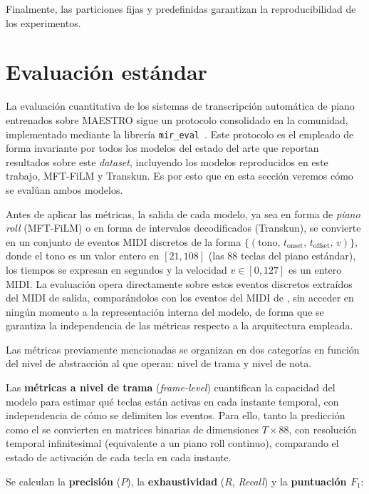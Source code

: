 \documentclass[11pt,spanish,listoffigures,listoftables]{tfgetsinf}
\begin{document}
Finalmente, las particiones fijas y predefinidas garantizan la reproducibilidad de los experimentos.

\section{Evaluación estándar}
\label{sec:metricas}
La evaluación cuantitativa de los sistemas de transcripción automática de piano entrenados sobre MAESTRO sigue un protocolo consolidado en la comunidad, implementado mediante la librería \texttt{mir\_eval}~\cite{raffel2014mireval}. Este protocolo 
es el empleado de forma invariante por todos los modelos del estado del arte que reportan resultados sobre este \textit{dataset}, incluyendo los modelos reproducidos en este trabajo, MFT-FiLM y Transkun. Es por esto que en esta sección veremos cómo se evalúan ambos modelos.

Antes de aplicar las métricas, la salida de cada modelo, ya sea en forma de \textit{piano roll} (MFT-FiLM) o en forma de intervalos decodificados (Transkun), se convierte en un conjunto de eventos MIDI discretos de la forma $\{(\text{tono},\, t_{\text{onset}},\, t_{\text{offset}},\, v)\}$,
donde el tono es un valor entero en $[21, 108]$ (las 88 teclas del piano estándar), los tiempos se expresan en segundos y la velocidad $v \in [0, 127]$ es un entero MIDI. La evaluación opera directamente sobre estos eventos discretos
extraídos del MIDI de salida, comparándolos con los eventos del MIDI de , sin acceder en ningún momento a la representación interna del modelo, de forma que se garantiza la independencia de las métricas respecto a la arquitectura empleada.

Las métricas previamente mencionadas se organizan en dos categorías en función del nivel de abstracción al que operan: nivel de trama y nivel de nota.

Las \textbf{métricas a nivel de trama} (\textit{frame-level}) cuantifican la capacidad del modelo para estimar qué teclas están activas en cada instante temporal, con independencia de cómo se delimiten los eventos. Para ello, tanto la predicción como el 
se convierten en matrices binarias de dimensiones $T \times 88$, con resolución temporal infinitesimal (equivalente a un piano roll continuo), comparando el estado de activación de cada tecla en cada instante.

Se calculan la \textbf{precisión} ($P$), la \textbf{exhaustividad} ($R$, \textit{Recall}) y la \textbf{puntuación $F_1$}:
\end{document}
